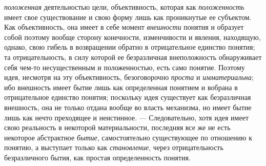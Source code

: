 \documentclass[twoside]{article}
\begin{document}
{{{{\em положенная}
деятельностью цели, объективность, которая как
{\em положенность} имеет
свое существование и свою форму лишь как проникнутые ее субъектом. Как
объективность, она имеет в себе момент
{\em внешности} понятия и
образует собой поэтому вообще сторону конечности, изменчивости и явления,
находящую, однако, свою гибель в возвращении обратно в отрицательное
единство понятия; та отрицательность, в силу которой ее безразличная
внеположность обнаруживает себя чем-то несущественным и положенностью, есть
само понятие. Поэтому идея, несмотря на эту объективность, безоговорочно
{\em проста} и
{\em имматериальна}; ибо
внешность имеет бытие лишь как определенная понятием и вобрана в
отрицательное единство понятия; поскольку идея существует как безразличная
внешность, она не только отдана вообще во власть механизма, но имеет бытие
лишь как нечто преходящее и неистинное. — Следовательно,
хотя идея имеет свою реальность в некоторой материальности, последняя все
же не есть некоторое абстрактное
{\em бытие},
самостоятельно существующее по отношению к понятию, а
выступает только как {\em становление},
через отрицательность безразличного бытия, как простая
определенность понятия.

}}}
\end{document}
